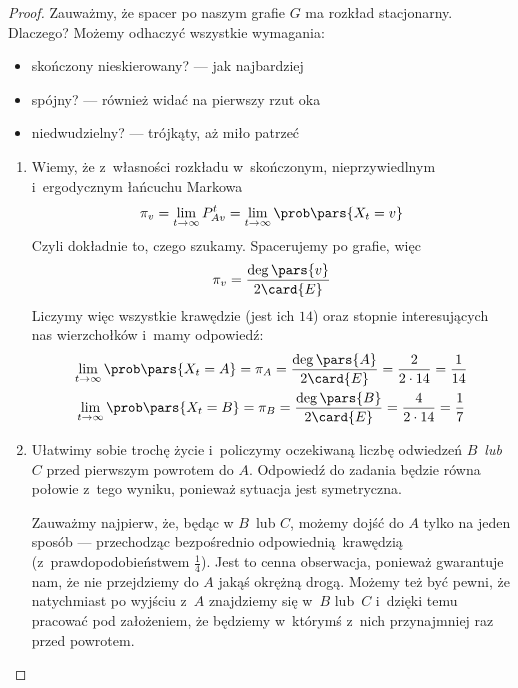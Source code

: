 \begin{proof} Zauważmy, że spacer po naszym grafie \(G\) ma rozkład stacjonarny. Dlaczego? Możemy odhaczyć wszystkie wymagania:
	\begin{itemize}
		\item skończony nieskierowany? --- jak najbardziej
		\item spójny? --- również widać na pierwszy rzut oka
		\item niedwudzielny? --- trójkąty, aż miło patrzeć
	\end{itemize}
	\begin{enumerate}[label=(\roman*)]
		\item Wiemy, że z~własności rozkładu w~skończonym, nieprzywiedlnym i~ergodycznym łańcuchu Markowa
		      \begin{equation*}
			      \pi_v = \lim_{t \to \infty} P_{Av}^t = \lim_{t \to \infty} \prob\pars{X_t = v}
		      \end{equation*}
		      Czyli dokładnie to, czego szukamy. Spacerujemy po grafie, więc
		      \begin{equation*}
			      \pi_v = \frac{\deg\pars{v}}{2\card{E}}
		      \end{equation*}
		      Liczymy więc wszystkie krawędzie (jest ich \(14\)) oraz stopnie interesujących nas wierzchołków i~mamy odpowiedź:
		      \begin{gather*}
			      \lim_{t \to \infty} \prob\pars{X_t = A}
			      = \pi_A
			      = \frac{\deg\pars{A}}{2\card{E}}
			      = \frac{2}{2 \cdot 14}
			      = \frac{1}{14}\\
			      \lim_{t \to \infty} \prob\pars{X_t = B}
			      = \pi_B
			      = \frac{\deg\pars{B}}{2\card{E}}
			      = \frac{4}{2 \cdot 14}
			      = \frac{1}{7}
		      \end{gather*}
		\item Ułatwimy sobie trochę życie i~policzymy oczekiwaną liczbę odwiedzeń \(B\)~\emph{lub} \(C\) przed pierwszym powrotem do \(A\). Odpowiedź do zadania będzie równa połowie z~tego wyniku, ponieważ sytuacja jest symetryczna.

		      Zauważmy najpierw, że, będąc w \(B\)~lub \(C\), możemy dojść do \(A\) tylko na jeden sposób --- przechodząc bezpośrednio odpowiednią krawędzią (z~prawdopodobieństwem \(\frac{1}{4}\)). Jest to cenna obserwacja, ponieważ gwarantuje nam, że nie przejdziemy do \(A\) jakąś okrężną drogą. Możemy też być pewni, że natychmiast po wyjściu z~\(A\) znajdziemy się w~\(B\) lub~\(C\) i~dzięki temu pracować pod założeniem, że będziemy w~którymś z~nich przynajmniej raz przed powrotem.


\end{enumerate}
\end{proof}
